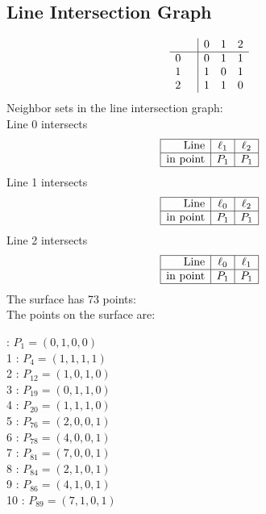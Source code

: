 \documentclass{article}
\begin{document}
{\subsection*{Line Intersection Graph}
{\arraycolsep=1pt
$$
\begin{array}{rr|*{3}r}
 &  & 0 & 1 & 2\\
\hline
0 &  & 0 & 1 & 1\\
1 &  & 1 & 0 & 1\\
2 &  & 1 & 1 & 0\\
\end{array}
$$
}%
Neighbor sets in the line intersection graph:\\
Line 0 intersects 
$$
\begin{array}{|r*{2}{|c}|}
\hline
\mbox{Line}  & \ell_{1} & \ell_{2}\\
\hline
\mbox{in point}  & P_{1} & P_{1}\\
\hline
\end{array}
$$
Line 1 intersects 
$$
\begin{array}{|r*{2}{|c}|}
\hline
\mbox{Line}  & \ell_{0} & \ell_{2}\\
\hline
\mbox{in point}  & P_{1} & P_{1}\\
\hline
\end{array}
$$
Line 2 intersects 
$$
\begin{array}{|r*{2}{|c}|}
\hline
\mbox{Line}  & \ell_{0} & \ell_{1}\\
\hline
\mbox{in point}  & P_{1} & P_{1}\\
\hline
\end{array}
$$
The surface has 73 points:\\
The points on the surface are:\\
\begin{multicols}{3}
 : $P_{1}=( 0, 1, 0, 0 )$\\
1 : $P_{4}=( 1, 1, 1, 1 )$\\
2 : $P_{12}=( 1, 0, 1, 0 )$\\
3 : $P_{19}=( 0, 1, 1, 0 )$\\
4 : $P_{20}=( 1, 1, 1, 0 )$\\
5 : $P_{76}=( 2, 0, 0, 1 )$\\
6 : $P_{78}=( 4, 0, 0, 1 )$\\
7 : $P_{81}=( 7, 0, 0, 1 )$\\
8 : $P_{84}=( 2, 1, 0, 1 )$\\
9 : $P_{86}=( 4, 1, 0, 1 )$\\
10 : $P_{89}=( 7, 1, 0, 1 )$\\

\end{multicols}}
\end{document}

